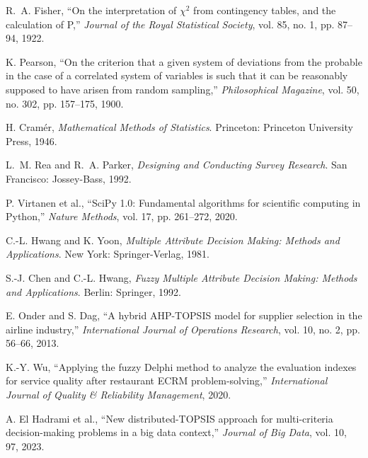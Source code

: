 \documentclass[12pt,a4paper,oneside]{book}
\begin{document}
\begin{enumerate}[label={[\arabic*]}, leftmargin=*]
\item \label{Fisher1922} R.~A. Fisher, ``On the interpretation of $\chi^2$ from contingency tables, and the calculation of P,'' \emph{Journal of the Royal Statistical Society}, vol. 85, no. 1, pp. 87--94, 1922.

\item \label{Pearson1900} K. Pearson, ``On the criterion that a given system of deviations from the probable in the case of a correlated system of variables is such that it can be reasonably supposed to have arisen from random sampling,'' \emph{Philosophical Magazine}, vol. 50, no. 302, pp. 157--175, 1900.

\item \label{Cramer1946} H. Cramér, \emph{Mathematical Methods of Statistics}. Princeton: Princeton University Press, 1946.

\item \label{Rea1992} L.~M. Rea and R.~A. Parker, \emph{Designing and Conducting Survey Research}. San Francisco: Jossey-Bass, 1992.

\item \label{VirtanenScipy2020} P. Virtanen et al., ``SciPy 1.0: Fundamental algorithms for scientific computing in Python,'' \emph{Nature Methods}, vol. 17, pp. 261--272, 2020.

\item \label{HwangYoon1981} C.-L. Hwang and K. Yoon, \emph{Multiple Attribute Decision Making: Methods and Applications}. New York: Springer-Verlag, 1981.

\item \label{ChenHwang1992} S.-J. Chen and C.-L. Hwang, \emph{Fuzzy Multiple Attribute Decision Making: Methods and Applications}. Berlin: Springer, 1992.

\item \label{Onder2013} E. Onder and S. Dag, ``A hybrid AHP-TOPSIS model for supplier selection in the airline industry,'' \emph{International Journal of Operations Research}, vol. 10, no. 2, pp. 56--66, 2013.

\item \label{Wu2020} K.-Y. Wu, ``Applying the fuzzy Delphi method to analyze the evaluation indexes for service quality after restaurant ECRM problem-solving,'' \emph{International Journal of Quality \& Reliability Management}, 2020.

\item \label{ElHadrami2023} A. El Hadrami et al., ``New distributed-TOPSIS approach for multi-criteria decision-making problems in a big data context,'' \emph{Journal of Big Data}, vol. 10, 97, 2023.


\end{enumerate}
\end{document}
